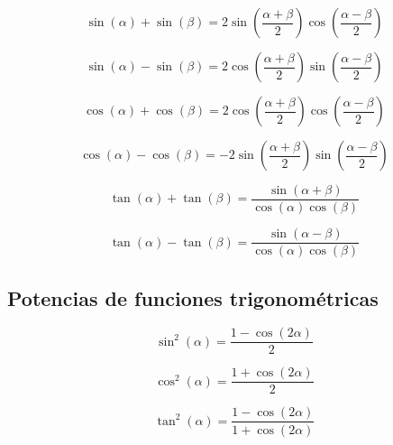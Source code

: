 \begin{proposición}
$$\sin(\alpha) + \sin(\beta) = 2\sin\left(\frac{\alpha + \beta}{2}\right)\cos\left(\frac{\alpha - \beta}{2}\right)$$
\end{proposición}

\begin{proposición}
$$\sin(\alpha) - \sin(\beta) = 2\cos\left(\frac{\alpha + \beta}{2}\right)\sin\left(\frac{\alpha - \beta}{2}\right)$$
\end{proposición}

\begin{proposición}
$$\cos(\alpha) + \cos(\beta) = 2\cos\left(\frac{\alpha + \beta}{2}\right)\cos\left(\frac{\alpha - \beta}{2}\right)$$
\end{proposición}

\begin{proposición}
$$\cos(\alpha) - \cos(\beta) = -2\sin\left(\frac{\alpha + \beta}{2}\right)\sin\left(\frac{\alpha - \beta}{2}\right)$$
\end{proposición}

\begin{proposición}
$$\tan(\alpha) + \tan(\beta) = \frac{\sin(\alpha + \beta)}{\cos(\alpha)\cos(\beta)}$$
\end{proposición}

\begin{proposición}
$$\tan(\alpha) - \tan(\beta) = \frac{\sin(\alpha - \beta)}{\cos(\alpha)\cos(\beta)}$$
\end{proposición}

\subsection{Potencias de funciones trigonométricas}

\begin{proposición}
$$\sin^2(\alpha) = \frac{1 - \cos(2\alpha)}{2}$$
\end{proposición}

\begin{proposición}
$$\cos^2(\alpha) = \frac{1 + \cos(2\alpha)}{2}$$
\end{proposición}

\begin{proposición}
$$\tan^2(\alpha) = \frac{1 - \cos(2\alpha)}{1 + \cos(2\alpha)}$$
\end{proposición}

